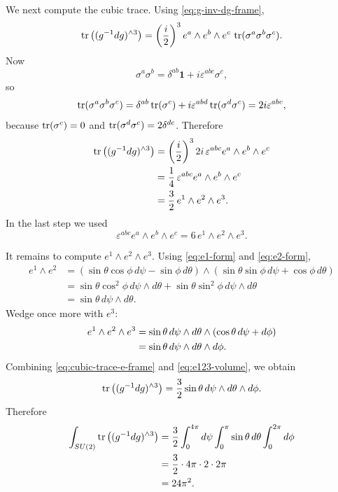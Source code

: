 \medskip

\noindent We next compute the cubic trace. Using \eqref{eq:g-inv-dg-frame},
\begin{equation*}
\operatorname{tr}\left((g^{-1}dg)^{\wedge 3}\right)
=
\left(\frac{i}{2}\right)^3
e^a\wedge e^b\wedge e^c\,
\operatorname{tr}(\sigma^a\sigma^b\sigma^c).
\end{equation*}
Now
\begin{equation*}
\sigma^a\sigma^b = \delta^{ab}\mathbf{1} + i\varepsilon^{abc}\sigma^c,
\end{equation*}
so
\begin{equation*}
\operatorname{tr}(\sigma^a\sigma^b\sigma^c)
=
\delta^{ab}\operatorname{tr}(\sigma^c)
+ i\varepsilon^{abd}\operatorname{tr}(\sigma^d\sigma^c)
=
2i\varepsilon^{abc},
\end{equation*}
because $\operatorname{tr}(\sigma^c)=0$ and $\operatorname{tr}(\sigma^d\sigma^c)=2\delta^{dc}$. Therefore
\begin{align}
\operatorname{tr}\left((g^{-1}dg)^{\wedge 3}\right)
&=
\left(\frac{i}{2}\right)^3 2i\,\varepsilon^{abc}e^a\wedge e^b\wedge e^c \notag\\
&=
\frac{1}{4}\,\varepsilon^{abc}e^a\wedge e^b\wedge e^c \notag\\
&=
\frac{3}{2}\,e^1\wedge e^2\wedge e^3.
\label{eq:cubic-trace-e-frame}
\end{align}
In the last step we used
\begin{equation*}
\varepsilon^{abc}e^a\wedge e^b\wedge e^c = 6\,e^1\wedge e^2\wedge e^3.
\end{equation*}

\medskip

\noindent It remains to compute $e^1\wedge e^2\wedge e^3$. Using \eqref{eq:e1-form} and \eqref{eq:e2-form},
\begin{align*}
e^1\wedge e^2
&=
\left(\sin\theta\cos\phi\,d\psi - \sin\phi\,d\theta\right)
\wedge
\left(\sin\theta\sin\phi\,d\psi + \cos\phi\,d\theta\right) \\
&=
\sin\theta\cos^2\phi\, d\psi\wedge d\theta
+ \sin\theta\sin^2\phi\, d\psi\wedge d\theta \\
&=
\sin\theta\, d\psi\wedge d\theta.
\end{align*}
Wedge once more with $e^3$:
\begin{align}
e^1\wedge e^2\wedge e^3
&=
\sin\theta\, d\psi\wedge d\theta\wedge(\cos\theta\,d\psi + d\phi) \notag\\
&=
\sin\theta\, d\psi\wedge d\theta\wedge d\phi.
\label{eq:e123-volume}
\end{align}
Combining \eqref{eq:cubic-trace-e-frame} and \eqref{eq:e123-volume}, we obtain
\begin{equation}\label{eq:tr-gdg-cubed-euler}
\operatorname{tr}\left((g^{-1}dg)^{\wedge 3}\right)
=
\frac{3}{2}\sin\theta\, d\psi\wedge d\theta\wedge d\phi.
\end{equation}
Therefore
\begin{align}
\int_{SU(2)}\operatorname{tr}\left((g^{-1}dg)^{\wedge 3}\right)
&=
\frac{3}{2}
\int_0^{4\pi} d\psi
\int_0^\pi \sin\theta\, d\theta
\int_0^{2\pi} d\phi \notag\\
&=
\frac{3}{2}\cdot 4\pi \cdot 2 \cdot 2\pi \notag\\
&= 24\pi^2.
\label{eq:S3-integral}
\end{align}

